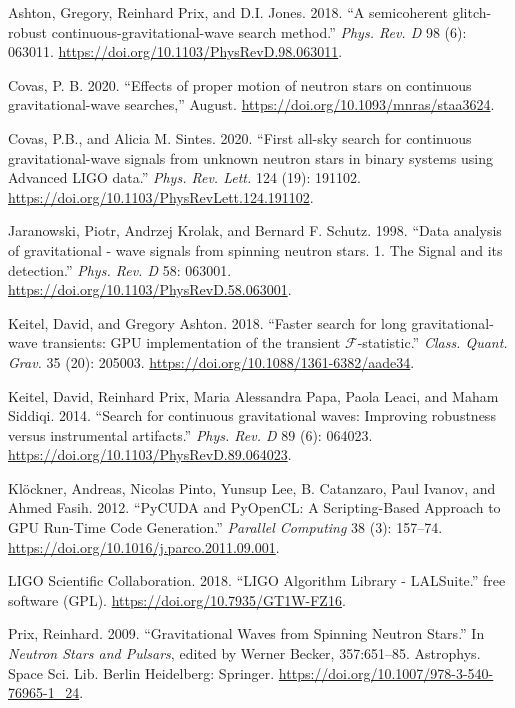 \documentclass[10pt,a4paper,onecolumn]{article}
\begin{document}
\leavevmode\hypertarget{ref-Ashton:2018qth}{}%
Ashton, Gregory, Reinhard Prix, and D.I. Jones. 2018. ``A semicoherent
glitch-robust continuous-gravitational-wave search method.'' \emph{Phys.
Rev. D} 98 (6): 063011.
\url{https://doi.org/10.1103/PhysRevD.98.063011}.

\leavevmode\hypertarget{ref-Covas:2020hcy}{}%
Covas, P. B. 2020. ``Effects of proper motion of neutron stars on
continuous gravitational-wave searches,'' August.
\url{https://doi.org/10.1093/mnras/staa3624}.

\leavevmode\hypertarget{ref-Covas:2020nwy}{}%
Covas, P.B., and Alicia M. Sintes. 2020. ``First all-sky search for
continuous gravitational-wave signals from unknown neutron stars in
binary systems using Advanced LIGO data.'' \emph{Phys. Rev. Lett.} 124
(19): 191102. \url{https://doi.org/10.1103/PhysRevLett.124.191102}.

\leavevmode\hypertarget{ref-Jaranowski:1998qm}{}%
Jaranowski, Piotr, Andrzej Krolak, and Bernard F. Schutz. 1998. ``Data
analysis of gravitational - wave signals from spinning neutron stars. 1.
The Signal and its detection.'' \emph{Phys. Rev. D} 58: 063001.
\url{https://doi.org/10.1103/PhysRevD.58.063001}.

\leavevmode\hypertarget{ref-Keitel:2018pxz}{}%
Keitel, David, and Gregory Ashton. 2018. ``Faster search for long
gravitational-wave transients: GPU implementation of the transient
\(\mathcal F\)-statistic.'' \emph{Class. Quant. Grav.} 35 (20): 205003.
\url{https://doi.org/10.1088/1361-6382/aade34}.

\leavevmode\hypertarget{ref-Keitel:2013wga}{}%
Keitel, David, Reinhard Prix, Maria Alessandra Papa, Paola Leaci, and
Maham Siddiqi. 2014. ``Search for continuous gravitational waves:
Improving robustness versus instrumental artifacts.'' \emph{Phys. Rev.
D} 89 (6): 064023. \url{https://doi.org/10.1103/PhysRevD.89.064023}.

\leavevmode\hypertarget{ref-Kloeckner:2012pyc}{}%
Klöckner, Andreas, Nicolas Pinto, Yunsup Lee, B. Catanzaro, Paul Ivanov,
and Ahmed Fasih. 2012. ``PyCUDA and PyOpenCL: A Scripting-Based Approach
to GPU Run-Time Code Generation.'' \emph{Parallel Computing} 38 (3):
157--74. \url{https://doi.org/10.1016/j.parco.2011.09.001}.

\leavevmode\hypertarget{ref-lalsuite}{}%
LIGO Scientific Collaboration. 2018. ``LIGO Algorithm Library -
LALSuite.'' free software (GPL).
\url{https://doi.org/10.7935/GT1W-FZ16}.

\leavevmode\hypertarget{ref-Prix:2009oha}{}%
Prix, Reinhard. 2009. ``Gravitational Waves from Spinning Neutron
Stars.'' In \emph{Neutron Stars and Pulsars}, edited by Werner Becker,
357:651--85. Astrophys. Space Sci. Lib. Berlin Heidelberg: Springer.
\url{https://doi.org/10.1007/978-3-540-76965-1_24}.
\end{document}
